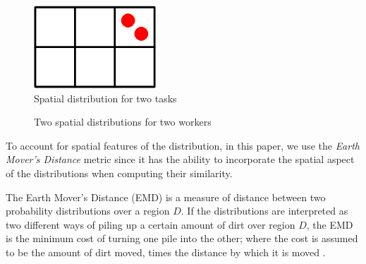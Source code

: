 \begin{figure}[t]
  \centering
  \label{fig:S_T}
  \includegraphics[scale=0.5]{figures/S_T.png}
  \vspace{-0.2cm}
  \caption{Spatial distribution for two tasks}
\end{figure}

\begin{figure}[t]
    \centering
    \vspace{-0.2cm}
    \caption{Two spatial distributions for two workers}\label{fig:S_W}
\end{figure}

To account for spatial features of the distribution, in this paper, we use the \textit{Earth Mover's Distance} metric since it has the ability to incorporate the spatial aspect of the distributions when computing their similarity.

\begin{definition}
The Earth Mover's Distance (EMD) is a measure of distance between two probability distributions over a region $D$. If the distributions are interpreted as two different ways of piling up a certain amount of dirt over region $D$, the EMD is the minimum cost of turning one pile into the other; where the cost is assumed to be the amount of dirt moved, times the distance by which it is moved \cite{Rubner98}.
\end{definition}

